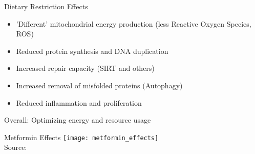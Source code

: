 \begin{frame}[c]{Dietary Restriction Effects}
    \large
    \begin{itemize}[<+(1)->]
        \item 'Different' mitochondrial energy production (less Reactive Oxygen Species, ROS)
        \item Reduced protein synthesis and DNA duplication
        \item Increased repair capacity (SIRT and others)
        \item Increased removal of misfolded proteins (Autophagy)
        \item Reduced inflammation and proliferation
    \end{itemize}
    \pause
    Overall: Optimizing energy and resource usage
\end{frame}



\begin{frame}[c]{Metformin Effects}
    \scriptsize
    \texttt{[image: metformin\_effects]} \\
    Source: \cite{podhorecka2017metformin}
\end{frame}

